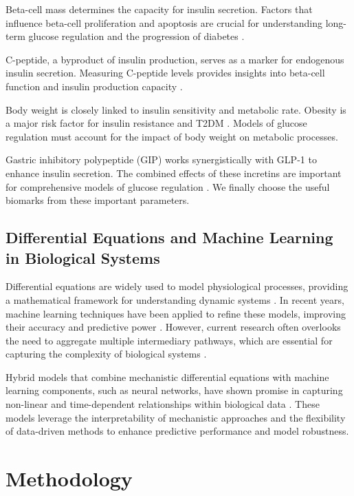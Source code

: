 \documentclass[9pt,shortpaper,twoside,web]{ieeecolor}
\begin{document}
Beta-cell mass determines the capacity for insulin secretion. Factors that influence beta-cell proliferation and apoptosis are crucial for understanding long-term glucose regulation and the progression of diabetes \cite{mazucanti2024beta, carr2024microrna}.

C-peptide, a byproduct of insulin production, serves as a marker for endogenous insulin secretion. Measuring C-peptide levels provides insights into beta-cell function and insulin production capacity \cite{ryan2018cpeptide}.

Body weight is closely linked to insulin sensitivity and metabolic rate. Obesity is a major risk factor for insulin resistance and T2DM \cite{lean2024obesity}. Models of glucose regulation must account for the impact of body weight on metabolic processes.

Gastric inhibitory polypeptide (GIP) works synergistically with GLP-1 to enhance insulin secretion. The combined effects of these incretins are important for comprehensive models of glucose regulation \cite{hansen2024gip}. We finally choose the useful biomarks from these important parameters.

\subsection{Differential Equations and Machine Learning in Biological Systems}

Differential equations are widely used to model physiological processes, providing a mathematical framework for understanding dynamic systems \cite{ashyrbayev2023equations}. In recent years, machine learning techniques have been applied to refine these models, improving their accuracy and predictive power \cite{raghu2024hybridml}. However, current research often overlooks the need to aggregate multiple intermediary pathways, which are essential for capturing the complexity of biological systems \cite{sun2024pathways}.

Hybrid models that combine mechanistic differential equations with machine learning components, such as neural networks, have shown promise in capturing non-linear and time-dependent relationships within biological data \cite{niemi2024hybrid}. These models leverage the interpretability of mechanistic approaches and the flexibility of data-driven methods to enhance predictive performance and model robustness.

\section{Methodology}
\end{document}
